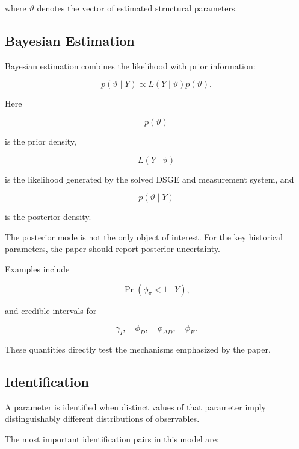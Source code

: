 where \(\vartheta\) denotes the vector of estimated structural parameters.

\subsection{Bayesian Estimation}
\label{app:bayesian}

Bayesian estimation combines the likelihood with prior information:

\begin{equation}
\boxed{
p(\vartheta\mid Y)
\propto
L(Y\mid\vartheta)p(\vartheta).
}
\label{eq:bayes}
\end{equation}

Here

\[
p(\vartheta)
\]

is the prior density,

\[
L(Y\mid\vartheta)
\]

is the likelihood generated by the solved DSGE and measurement system, and

\[
p(\vartheta\mid Y)
\]

is the posterior density.

The posterior mode is not the only object of interest. For the key historical
parameters, the paper should report posterior uncertainty.

Examples include

\[
\Pr(\phi_\pi<1\mid Y),
\]

and credible intervals for

\[
\gamma_I,\quad
\phi_D,\quad
\phi_{\Delta D},\quad
\phi_E.
\]

These quantities directly test the mechanisms emphasized by the paper.

\subsection{Identification}
\label{app:identification}

A parameter is identified when distinct values of that parameter imply
distinguishably different distributions of observables.

The most important identification pairs in this model are:

